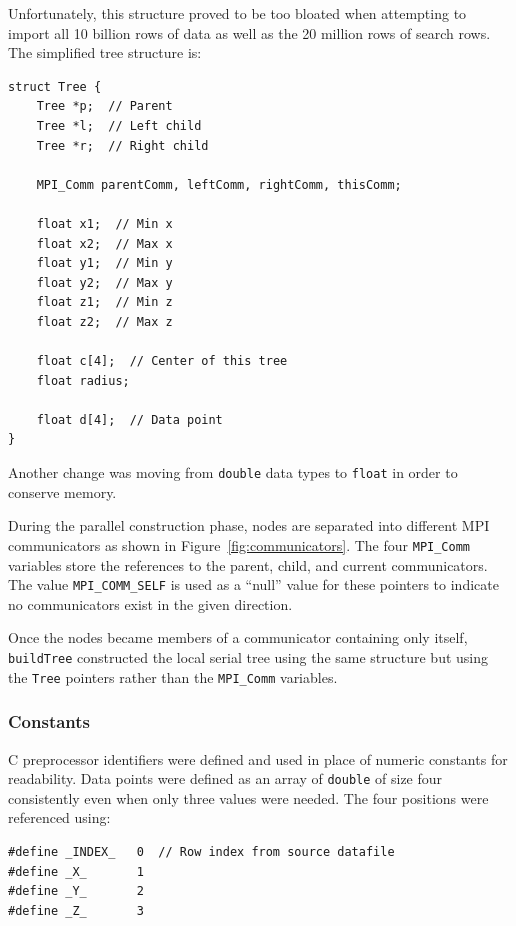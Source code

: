 \documentclass{article}
\begin{document}
Unfortunately, this structure proved to be too bloated when attempting to import all 10 billion rows of data as well as the 20 million rows of search rows. The simplified tree structure is:

\begin{minipage}{\linewidth}
\lstset{language=C++, keepspaces=true}
\begin{lstlisting}
struct Tree {
	Tree *p;  // Parent
	Tree *l;  // Left child
	Tree *r;  // Right child

	MPI_Comm parentComm, leftComm, rightComm, thisComm;

	float x1;  // Min x
	float x2;  // Max x
	float y1;  // Min y
	float y2;  // Max y
	float z1;  // Min z
	float z2;  // Max z

	float c[4];  // Center of this tree
	float radius;

	float d[4];  // Data point
}
\end{lstlisting}
\end{minipage}


Another change was moving from \texttt{double} data types to \texttt{float} in order to conserve memory.

During the parallel construction phase, nodes are separated into different MPI communicators as shown in Figure~\ref{fig:communicators}. The four \texttt{MPI\_Comm} variables store the references to the parent, child, and current communicators. The value \texttt{MPI\_COMM\_SELF} is used as a ``null'' value for these pointers to indicate no communicators exist in the given direction.

Once the nodes became members of a communicator containing only itself, \texttt{buildTree} constructed the local serial tree using the same structure but using the \texttt{Tree} pointers rather than the \texttt{MPI\_Comm} variables.


%
%

\subsubsection{Constants}\label{sec:constants}

C preprocessor identifiers were defined and used in place of numeric constants for readability. Data points were defined as an array of \texttt{double} of size four consistently even when only three values were needed. The four positions were referenced using:

\lstset{language=C++, keepspaces=true}
\begin{lstlisting}
#define _INDEX_   0  // Row index from source datafile
#define _X_       1
#define _Y_       2
#define _Z_       3
\end{lstlisting}
\end{document}
